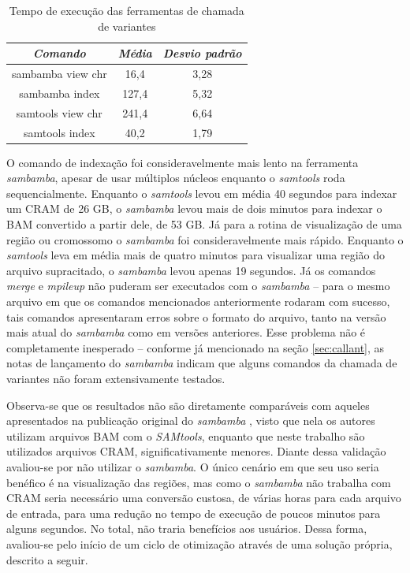 \documentclass[cic,tc]{iiufrgs}
\begin{document}
\begin{table}[h]
    \caption{Tempo de execução das ferramentas de chamada de variantes}
    \centering
        \begin{tabular}{c|c|c}
          \hline
          \textit{Comando}  &   \textit{Média}  & \textit{Desvio padrão} \\
          \hline
          \hline
          sambamba view chr & 16,4  & 3,28 \\
          sambamba index    & 127,4 & 5,32 \\
          samtools view chr & 241,4 & 6,64 \\
          samtools index    & 40,2  & 1,79 \\
          \hline
        \end{tabular}
    \label{tbl:sambamba}
\end{table}

O comando de indexação foi consideravelmente mais lento na ferramenta \textit{sambamba},
apesar de usar múltiplos núcleos enquanto o \textit{samtools} roda sequencialmente.
Enquanto o \textit{samtools} levou em média 40 segundos para indexar um CRAM de 26 GB, o
\textit{sambamba} levou mais de dois minutos para indexar o BAM convertido a partir
dele, de 53 GB. Já para a rotina de visualização de uma região ou cromossomo o
\textit{sambamba} foi consideravelmente mais rápido. Enquanto o \textit{samtools} leva em média
mais de quatro minutos para visualizar uma região do arquivo supracitado, o
\textit{sambamba} levou apenas 19 segundos. Já os comandos \textit{merge} e
\textit{mpileup} não puderam ser executados com o \textit{sambamba} -- para o mesmo
arquivo em que os comandos mencionados anteriormente rodaram com sucesso, tais
comandos apresentaram erros sobre o formato do arquivo, tanto na versão mais
atual do \textit{sambamba} como em versões anteriores. Esse problema não é completamente
inesperado -- conforme já mencionado na seção \ref{sec:callant}, as notas de
lançamento do \textit{sambamba} indicam que alguns comandos da chamada de variantes não
foram extensivamente testados. 

Observa-se que os resultados não são diretamente comparáveis com aqueles
apresentados na publicação original do \textit{sambamba} \cite{tarasov2015sambamba},
visto que nela os autores utilizam arquivos BAM com o \textit{SAMtools}, enquanto que
neste trabalho são utilizados arquivos CRAM, significativamente menores. Diante
dessa validação avaliou-se por não utilizar o \textit{sambamba}. O único cenário em que
seu uso seria benéfico é na visualização das regiões, mas como o \textit{sambamba} não
trabalha com CRAM seria necessário uma conversão custosa, de várias horas para
cada arquivo de entrada, para uma redução no tempo de execução de poucos
minutos para alguns segundos.  No total, não traria benefícios aos usuários.
Dessa forma, avaliou-se pelo início de um ciclo de otimização através de uma
solução própria, descrito a seguir.
\end{document}
